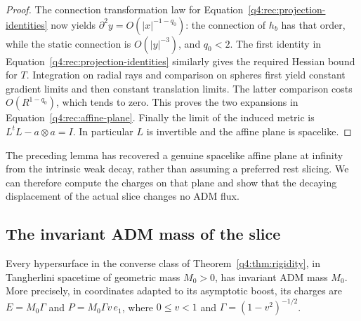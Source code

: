 \begin{proof}
The connection transformation law for
Equation~\eqref{q4:rec:projection-identities} now yields
$\partial^2y=O(|x|^{-1-q_0})$: the connection of $h_b$ has that order, while
the static connection is $O(|y|^{-3})$, and $q_0<2$.  The first identity in
Equation~\eqref{q4:rec:projection-identities} similarly gives the required
Hessian bound for $T$.  Integration on radial rays and comparison on spheres
first yield constant gradient limits and then constant translation limits.
The latter comparison costs $O(R^{1-q_0})$, which tends to zero.  This proves
the two expansions in Equation~\eqref{q4:rec:affine-plane}.  Finally the limit
of the induced metric is $L^tL-a\otimes a=I$.  In particular $L$ is
invertible and the affine plane is spacelike.
\end{proof}

The preceding lemma has recovered a genuine spacelike affine plane at
infinity from the intrinsic weak decay, rather than assuming a preferred
rest slicing. We can therefore compute the charges on that plane and show
that the decaying displacement of the actual slice changes no ADM flux.

\subsection{The invariant ADM mass of the slice}

\begin{proposition}
\label{q4:rec:converse-mass}
Every hypersurface in the converse class of Theorem~\ref{q4:thm:rigidity}, in
Tangherlini spacetime of geometric mass $M_0>0$, has invariant ADM mass $M_0$.
More precisely, in coordinates adapted to its asymptotic boost, its charges
are $E=M_0\Gamma$ and $P=M_0\Gamma v\,e_1$, where
$0\leq v<1$ and $\Gamma=(1-v^2)^{-1/2}$.
\end{proposition}

